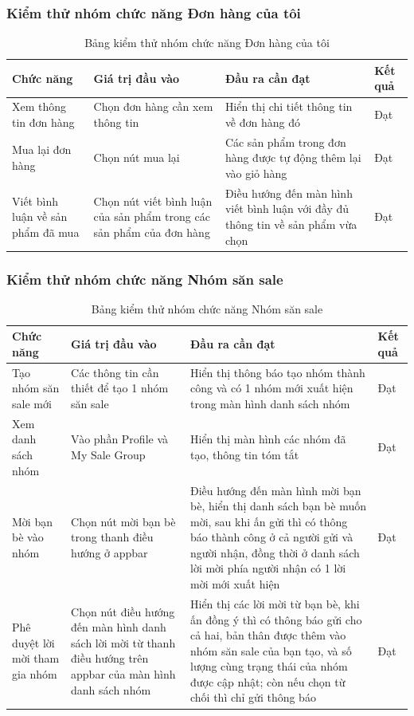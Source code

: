 \documentclass[../DoAn.tex]{subfiles}
\begin{document}
\subsubsection{Kiểm thử nhóm chức năng Đơn hàng của tôi}
\begin{table}[H]
\centering
\renewcommand{\arraystretch}{1.3}
\begin{tabularx}{\textwidth}{|X|X|X|>{\centering\arraybackslash}m{2cm}|}
\hline
\textbf{Chức năng} & \textbf{Giá trị đầu vào} & \textbf{Đầu ra cần đạt} & \textbf{Kết quả} \\ \hline
Xem thông tin đơn hàng & Chọn đơn hàng cần xem thông tin & Hiển thị chi tiết thông tin về đơn hàng đó & Đạt \\ \hline
Mua lại đơn hàng & Chọn nút mua lại & Các sản phẩm trong đơn hàng được tự động thêm lại vào giỏ hàng & Đạt \\ \hline
Viết bình luận về sản phẩm đã mua & Chọn nút viết bình luận của sản phẩm trong các sản phẩm của đơn hàng & Điều hướng đến màn hình viết bình luận với đầy đủ thông tin về sản phẩm vừa chọn & Đạt \\ \hline
\end{tabularx}
\caption{Bảng kiểm thử nhóm chức năng Đơn hàng của tôi}
\label{tab:myOrderTest}
\end{table}
\FloatBarrier
\subsubsection{Kiểm thử nhóm chức năng Nhóm săn sale}
\begin{table}[H]
\centering
\renewcommand{\arraystretch}{1.1}
\begin{tabular}{|p{2.8cm}|p{3.2cm}|p{6.3cm}|>{\centering\arraybackslash}p{1.3cm}|}
\hline
\textbf{Chức năng} & \textbf{Giá trị đầu vào} & \textbf{Đầu ra cần đạt} & \textbf{Kết quả} \\ \hline
Tạo nhóm săn sale mới & Các thông tin cần thiết để tạo 1 nhóm săn sale & Hiển thị thông báo tạo nhóm thành công và có 1 nhóm mới xuất hiện trong màn hình danh sách nhóm & Đạt \\ \hline
Xem danh sách nhóm & Vào phần Profile và My Sale Group & Hiển thị màn hình các nhóm đã tạo, thông tin tóm tắt & Đạt \\ \hline
Mời bạn bè vào nhóm & Chọn nút mời bạn bè trong thanh điều hướng ở appbar & Điều hướng đến màn hình mời bạn bè, hiển thị danh sách bạn bè muốn mời, sau khi ấn gửi thì có thông báo thành công ở cả người gửi và người nhận, đồng thời ở danh sách lời mời phía người nhận có 1 lời mời mới xuất hiện & Đạt \\ \hline
Phê duyệt lời mời tham gia nhóm & Chọn nút điều hướng đến màn hình danh sách lời mời từ thanh điều hướng trên appbar của màn hình danh sách nhóm & Hiển thị các lời mời từ bạn bè, khi ấn đồng ý thì có thông báo gửi cho cả hai, bản thân được thêm vào nhóm săn sale của bạn tạo, và số lượng cùng trạng thái của nhóm được cập nhật; còn nếu chọn từ chối thì chỉ gửi thông báo & Đạt \\ \hline
\end{tabular}
\caption{Bảng kiểm thử nhóm chức năng Nhóm săn sale}
\label{tab:saleGroupTest}
\end{table}
\end{document}
